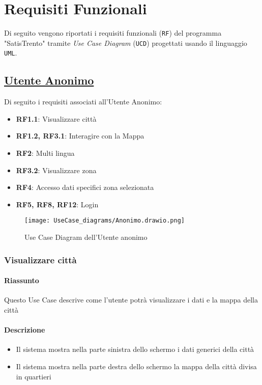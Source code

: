 \chapter{Requisiti Funzionali}
\label{ch:requisitiFunzionali}

Di seguito vengono riportati i requisiti funzionali (\texttt{RF}) del programma "SatisTrento" tramite \textit{Use Case Diagram} (\texttt{UCD}) progettati usando il linguaggio \texttt{UML}.

\section{\underline{Utente Anonimo}}
    Di seguito i requisiti associati all'Utente Anonimo:
    \begin{itemize}
        \item \textbf{RF1.1}: Visualizzare città
        \item \textbf{RF1.2, RF3.1}: Interagire con la Mappa
        \item \textbf{RF2}: Multi lingua
        \item \textbf{RF3.2}: Visualizzare zona
        \item \textbf{RF4}: Accesso dati specifici zona selezionata
        \item \textbf{RF5, RF8, RF12}: Login
    \end{itemize}
    \begin{figure}[H]
        \centering
        \texttt{[image: UseCase\_diagrams/Anonimo.drawio.png]}
        \caption{Use Case Diagram dell'Utente anonimo}
    \end{figure}

    \subsection{Visualizzare città}
        \subsubsection{Riassunto}
            Questo Use Case descrive come l'utente potrà visualizzare i dati e la mappa della città
        \subsubsection{Descrizione}
            \begin{itemize}
                \item Il sistema mostra nella parte sinistra dello schermo i dati generici della città
                \item Il sistema mostra nella parte destra dello schermo la mappa della città divisa in quartieri
            \end{itemize}
    
